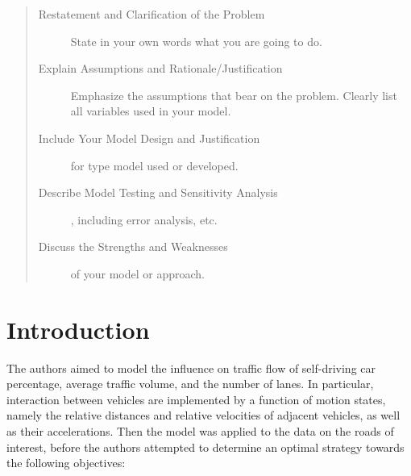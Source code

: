 \documentclass{icmmcm}
\begin{document}
\begin{summary}
\begin{quotation}
    \begin{description}
    \item[Restatement and Clarification of the Problem] State in
      your own words what you are going to do.
    \item[Explain Assumptions and Rationale/Justification]
      Emphasize the assumptions that bear on the problem. Clearly
      list all variables used in your model.
    \item[Include Your Model Design and Justification] for type
      model used or developed.
    \item[Describe Model Testing and Sensitivity Analysis],
      including error analysis, etc.
    \item[Discuss the Strengths and Weaknesses] of your model or
      approach.
  \end{description}
 \citep{comap-mcm-rules}
\end{quotation}

\end{summary}



\maketitle
\tableofcontents



\section{Introduction}%
\label{sec:introduction}

The authors aimed to model the influence on traffic flow of self-driving car percentage, average traffic volume, and the number of lanes. In particular, interaction between vehicles are implemented by a function of motion states, namely the relative distances and relative velocities of adjacent vehicles, as well as their accelerations. Then the model was applied to the data on the roads of interest, before the authors attempted to determine an optimal strategy towards the following objectives:
\end{document}
